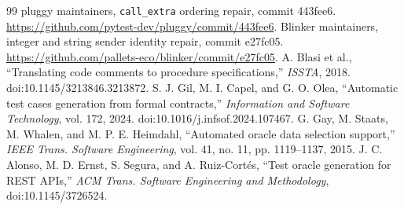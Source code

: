 \documentclass[conference]{IEEEtran}
\begin{document}
\begin{thebibliography}{99}
 pluggy maintainers, \texttt{call\_extra} ordering repair, commit 443fee6. \url{https://github.com/pytest-dev/pluggy/commit/443fee6}.
 Blinker maintainers, integer and string sender identity repair, commit e27fc05. \url{https://github.com/pallets-eco/blinker/commit/e27fc05}.
 A. Blasi et al., ``Translating code comments to procedure specifications,'' \emph{ISSTA}, 2018. doi:10.1145/3213846.3213872.
 S. J. Gil, M. I. Capel, and G. O. Olea, ``Automatic test cases generation from formal contracts,'' \emph{Information and Software Technology}, vol. 172, 2024. doi:10.1016/j.infsof.2024.107467.
 G. Gay, M. Staats, M. Whalen, and M. P. E. Heimdahl, ``Automated oracle data selection support,'' \emph{IEEE Trans. Software Engineering}, vol. 41, no. 11, pp. 1119--1137, 2015.
 J. C. Alonso, M. D. Ernst, S. Segura, and A. Ruiz-Cort\'es, ``Test oracle generation for REST APIs,'' \emph{ACM Trans. Software Engineering and Methodology}, doi:10.1145/3726524.
\end{thebibliography}
\end{document}
